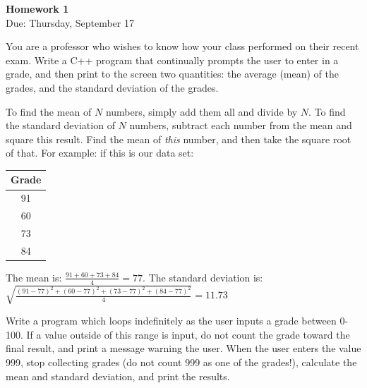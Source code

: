 \documentclass{article}
\begin{document}
\fancyfoot[C]{\thepage}
\vspace*{0cm}
\begin{center}
	{\LARGE \textbf{Homework 1}}\\
	\vspace{0.25cm}
	{\Large Due: Thursday, September 17}
\end{center}

You are a professor who wishes to know how your class performed on their recent exam. Write a C++ program that continually prompts the user to enter in a grade, and then print to the screen two quantities: the average (mean) of the grades, and the standard deviation of the grades.

To find the mean of $N$ numbers, simply add them all and divide by $N$. To find the standard deviation of $N$ numbers, subtract each number from the mean and square this result. Find the mean of \textit{this} number, and then take the square root of that. For example: if this is our data set:

\begin{table}[ht!]
\begin{tabular}{c}
	Grade\\
	\hline
	91\\
	60\\
	73\\
	84\\
\end{tabular}
\end{table}

The mean is: $\frac{91+60+73+84}{4}=77$. The standard deviation is: $\sqrt{\frac{(91-77)^2+(60-77)^2+(73-77)^2+(84-77)^2}{4}}=11.73$

Write a program which loops indefinitely as the user inputs a grade between 0-100. If a value outside of this range is input, do not count the grade toward the final result, and print a message warning the user. When the user enters the value 999, stop collecting grades (do not count 999 as one of the grades!), calculate the mean and standard deviation, and print the results. 
\end{document}
